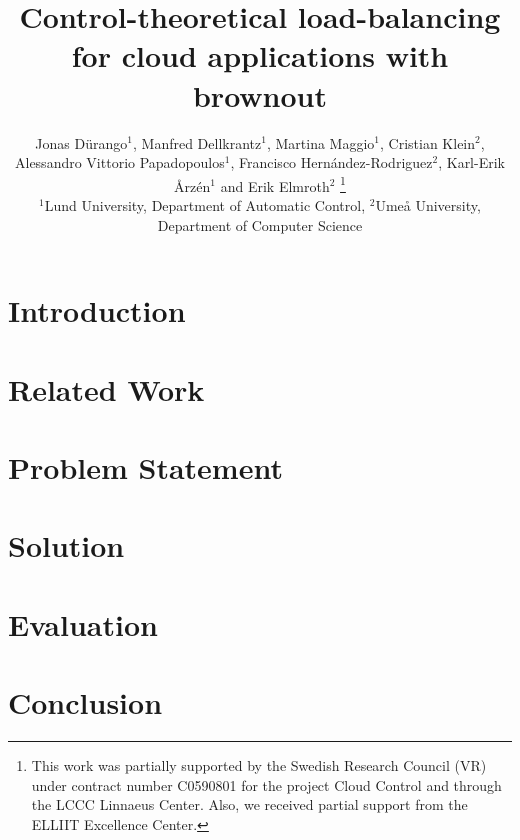 \documentclass[letterpaper, 10 pt, conference]{ieeeconf}
\title{\LARGE \bf Control-theoretical load-balancing for cloud applications with brownout}
\author{Jonas D{\"u}rango{$^1$}, Manfred Dellkrantz{$^1$}, Martina Maggio{$^1$}, Cristian Klein{$^2$}, \\
Alessandro Vittorio Papadopoulos{$^1$}, Francisco Hern{\'a}ndez-Rodriguez{$^2$}, Karl-Erik {\AA}rz\'en{$^1$} and Erik Elmroth{$^2$} \thanks{This work was partially supported by the Swedish Research Council
  (VR) under contract number C0590801 for the project Cloud Control
  and through the LCCC Linnaeus Center. Also, we received partial
  support from the ELLIIT Excellence Center.}\\
{\small {$^1$}Lund University, Department of Automatic Control, {$^2$}Ume{\aa} University, Department of Computer Science}}
\begin{document}
\maketitle
\thispagestyle{empty}
\pagestyle{empty}

\begin{abstract}

\end{abstract}

\section{Introduction}
\label{sec:introduction}


\section{Related Work}
\label{sec:related}


\section{Problem Statement}
\label{sec:problem}


\section{Solution}
\label{sec:solution}


\section{Evaluation}
\label{sec:evaluation}


\section{Conclusion}
\label{sec:conclusion}


\printbibliography
\end{document}
